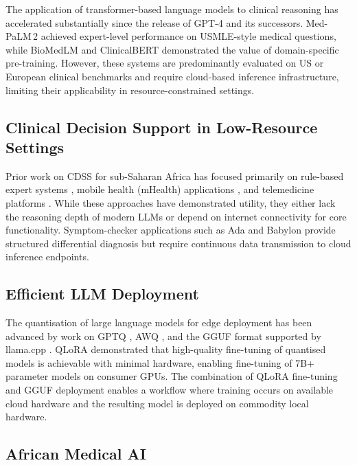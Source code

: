 \documentclass[journal]{IEEEtran}
\begin{document}
The application of transformer-based language models to clinical
reasoning has accelerated substantially since the release of
GPT-4 \cite{openai2023gpt4} and its successors. Med-PaLM\,2
\cite{singhal2023medpalm2} achieved expert-level performance on
USMLE-style medical questions, while BioMedLM \cite{bolton2022biomedlm}
and ClinicalBERT \cite{huang2019clinicalbert} demonstrated the value
of domain-specific pre-training. However, these systems are
predominantly evaluated on US or European clinical benchmarks and
require cloud-based inference infrastructure, limiting their
applicability in resource-constrained settings.

\subsection{Clinical Decision Support in Low-Resource Settings}

Prior work on CDSS for sub-Saharan Africa has focused primarily on
rule-based expert systems \cite{fraser2007clinician}, mobile health
(mHealth) applications \cite{labrique2013mhealth}, and telemedicine
platforms \cite{bastawrous2015ehealth}. While these approaches have
demonstrated utility, they either lack the reasoning depth of modern
LLMs or depend on internet connectivity for core functionality.
Symptom-checker applications such as Ada \cite{ada2020} and Babylon
\cite{babylon2020} provide structured differential diagnosis but
require continuous data transmission to cloud inference endpoints.

\subsection{Efficient LLM Deployment}

The quantisation of large language models for edge deployment has
been advanced by work on GPTQ \cite{frantar2022gptq},
AWQ \cite{lin2023awq}, and the GGUF format supported by
llama.cpp \cite{gerganov2023llamacpp}. QLoRA \cite{dettmers2023qlora}
demonstrated that high-quality fine-tuning of quantised models is
achievable with minimal hardware, enabling fine-tuning of 7B+
parameter models on consumer GPUs. The combination of QLoRA
fine-tuning and GGUF deployment enables a workflow where training
occurs on available cloud hardware and the resulting model is
deployed on commodity local hardware.

\subsection{African Medical AI}
\end{document}
